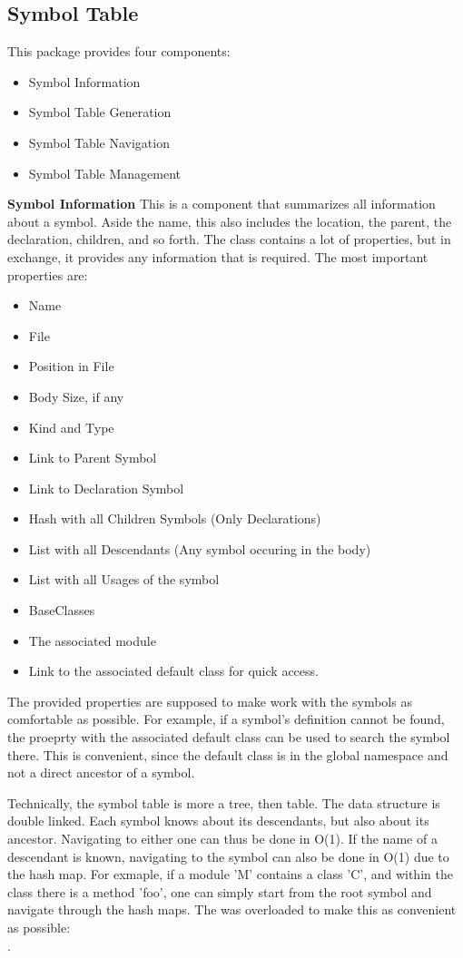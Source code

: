 \subsection{Symbol Table}
This package provides four components:
\begin{itemize}
    \item Symbol Information
    \item Symbol Table Generation
    \item Symbol Table Navigation
    \item Symbol Table Management
\end{itemize}

\textbf{Symbol Information}
This is a component that summarizes all information about a symbol. Aside the name, this also includes the location, the parent, the declaration, children, and so forth. The class contains a lot of properties, but in exchange, it provides any information that is required. The most important properties are:
\begin{itemize}
    \item Name
    \item File
    \item Position in File
    \item Body Size, if any
    \item Kind and Type
    \item Link to Parent Symbol
    \item Link to Declaration Symbol
    \item Hash with all Children Symbols (Only Declarations)
    \item List with all Descendants (Any symbol occuring in the body)
    \item List with all Usages of the symbol
    \item BaseClasses
    \item The associated module
    \item Link to the associated default class for quick access.
\end{itemize}
The provided properties are supposed to make work with the symbols as comfortable as possible. For example, if a symbol's definition cannot be found, the proeprty with the associated default class can be used to search the symbol there. This is convenient, since the default class is in the global namespace and not a direct ancestor of a symbol.

Technically, the symbol table is more a tree, then table. The data structure is double linked. Each symbol knows about its descendants, but also about its ancestor. Navigating to either one can thus be done in O(1). If the name of a descendant is known, navigating to the symbol can also be done in O(1) due to the hash map. For exmaple, if a module 'M' contains a class 'C', and within the class there is a method 'foo', one can simply start from the root symbol and navigate through the hash maps. The \code{[]} was overloaded to make this as convenient as possible:\\
.\\

